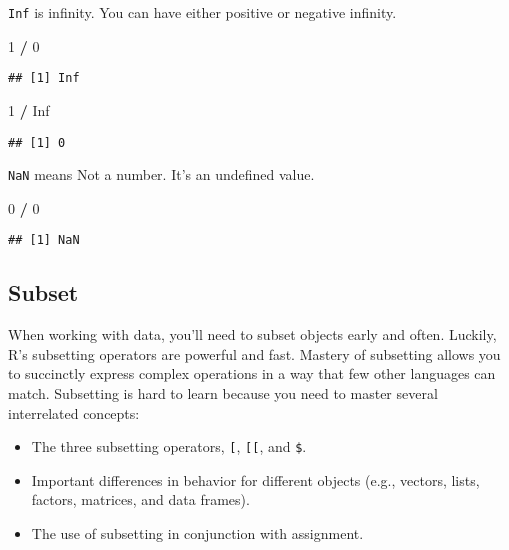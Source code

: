 \documentclass[
]{book}
\newenvironment{Shaded}{\begin{snugshade}}{\end{snugshade}}
\newcommand{\DecValTok}[1]{\textcolor[rgb]{0.00,0.00,0.81}{#1}}
\newcommand{\OperatorTok}[1]{\textcolor[rgb]{0.81,0.36,0.00}{\textbf{#1}}}
\newcommand{\OtherTok}[1]{\textcolor[rgb]{0.56,0.35,0.01}{#1}}
\newcommand{\StringTok}[1]{\textcolor[rgb]{0.31,0.60,0.02}{#1}}
\begin{document}
\texttt{Inf} is infinity. You can have either positive or negative infinity.

\begin{Shaded}
\begin{Highlighting}[]
\DecValTok{1} \OperatorTok{/}\StringTok{ }\DecValTok{0}
\end{Highlighting}
\end{Shaded}

\begin{verbatim}
## [1] Inf
\end{verbatim}

\begin{Shaded}
\begin{Highlighting}[]
\DecValTok{1} \OperatorTok{/}\StringTok{ }\OtherTok{Inf}
\end{Highlighting}
\end{Shaded}

\begin{verbatim}
## [1] 0
\end{verbatim}

\texttt{NaN} means Not a number. It's an undefined value.

\begin{Shaded}
\begin{Highlighting}[]
\DecValTok{0} \OperatorTok{/}\StringTok{ }\DecValTok{0}
\end{Highlighting}
\end{Shaded}

\begin{verbatim}
## [1] NaN
\end{verbatim}

\hypertarget{subset}{%
\subsection{Subset}\label{subset}}

When working with data, you'll need to subset objects early and often. Luckily, R's subsetting operators are powerful and fast. Mastery of subsetting allows you to succinctly express complex operations in a way that few other languages can match. Subsetting is hard to learn because you need to master several interrelated concepts:

\begin{itemize}
\item
  The three subsetting operators, \texttt{{[}}, \texttt{{[}{[}}, and \texttt{\$}.
\item
  Important differences in behavior for different objects (e.g., vectors, lists, factors, matrices, and data frames).
\item
  The use of subsetting in conjunction with assignment.
\end{itemize}
\end{document}
